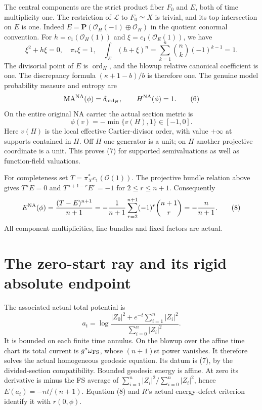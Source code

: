 \documentclass[10pt]{article}
\newcommand{\MA}{\operatorname{MA}}
\newcommand{\PP}{\mathbf P}
\begin{document}
The central components are the strict product fiber $F_0$ and $E$,
both of time multiplicity one. The restriction of $\mathcal L$ to
$F_0\simeq X$ is trivial, and its top intersection on $E$ is one.
Indeed $E=\PP(\mathcal O_H(-1)\oplus\mathcal O_H)$ in the quotient
conormal convention. For $h=c_1(\mathcal O_H(1))$ and
$\xi=c_1(\mathcal O_E(1))$, we have
\[
 \xi^2+h\xi=0,\quad \pi_*\xi=1,\quad
 \int_E(h+\xi)^n=\sum_{k=1}^n\binom nk(-1)^{k-1}=1.
\]
The divisorial point of $E$ is $\operatorname{ord}_H$, and the blowup
relative canonical coefficient is one. The discrepancy formula
$(\kappa+1-b)/b$ is therefore one. The genuine model probability
measure and entropy are
\[
 \MA^{\rm NA}(\phi)=\delta_{\operatorname{ord}_H},
                         \qquad H^{\rm NA}(\phi)=1.      \tag{6}
\]
On the entire original NA carrier the actual section metric is
\[
                    \phi(v)=-\min\{v(H),1\}\in[-1,0].   \tag{7}
\]
Here $v(H)$ is the local effective Cartier-divisor order, with value
$+\infty$ at supports contained in $H$. Off $H$ one generator is a
unit; on $H$ another projective coordinate is a unit. This proves
(7) for supported semivaluations as well as function-field valuations.

For completeness set $T=\pi_X^*c_1(\mathcal O(1))$. The projective
bundle relation above gives $T^nE=0$ and
$T^{n+1-r}E^r=-1$ for $2\leq r\leq n+1$.
Consequently
\[
 E^{\rm NA}(\phi)=\frac{(T-E)^{n+1}}{n+1}
 =-\frac1{n+1}\sum_{r=2}^{n+1}(-1)^r\binom{n+1}r
 =-\frac n{n+1}.                                      \tag{8}
\]
All component multiplicities, line bundles and fixed factors are actual.

\section{The zero-start ray and its rigid absolute endpoint}
The associated actual total potential is
\[
 a_t=\log\frac{|Z_0|^2+e^{-t}\sum_{i=1}^n|Z_i|^2}
                       {\sum_{i=0}^n|Z_i|^2}.          \tag{9}
\]
It is bounded on each finite time annulus. On the blowup over the
affine time chart its total current is $g^*\omega_{\rm FS}$, whose
$(n+1)$st power vanishes.
It therefore solves the actual homogeneous geodesic equation.
Its datum is (7), by the divided-section compatibility. Bounded
geodesic energy is affine. At zero its derivative is minus the FS
average of $\sum_{i=1}^n|Z_i|^2/\sum_{i=0}^n|Z_i|^2$, hence
$E(a_t)=-nt/(n+1)$. Equation (8) and $R$'s actual energy-defect
criterion identify it with $r(0,\phi)$.
\end{document}
